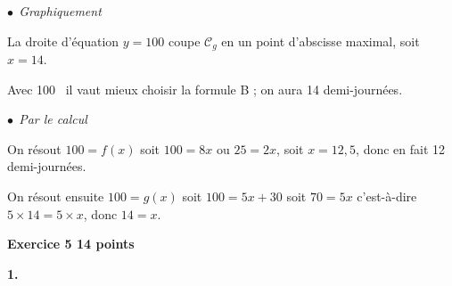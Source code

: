 \documentclass[10pt]{article}
\newcommand{\euro}{\eurologo{}}
\begin{document}
\begin{enumerate}
$\bullet~~$\emph{Graphiquement} 

La droite d'équation $y = 100$ coupe $\mathcal{C}_g$ en un point d'abscisse maximal, soit $x = 14$.

Avec 100~\euro{} il vaut mieux choisir la formule B ; on aura 14 demi-journées.

$\bullet~~$\emph{Par le calcul}

On résout $100 = f(x)$ soit $100 = 8x$ ou $25 = 2x$, soit $x = 12,5$, donc en fait 12 demi-journées.

On résout ensuite $100 = g(x)$ soit $100 = 5x + 30$ soit $70 = 5x$ c'est-à-dire $5 \times 14 = 5 \times x$, donc $14 = x$.
\end{enumerate}

\bigskip

\textbf{Exercice 5 \hfill 14 points}

\medskip

\textbf{1.}
\end{document}
